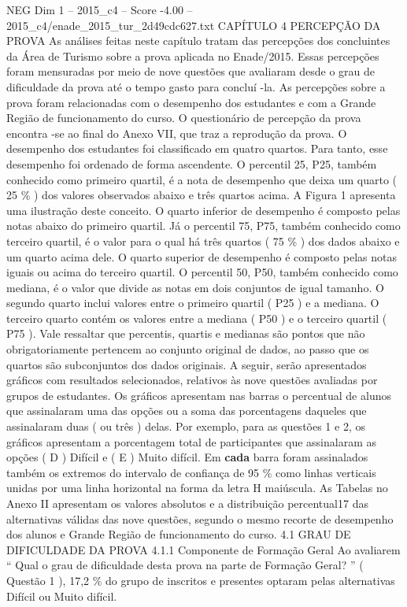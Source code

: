 \begin{textsample}{NEG Dim 1 – 2015\_c4 – Score -4.00 – 2015\_c4/enade\_2015\_tur\_2d49cdc627.txt}  \label{ex:f1_neg_102}
CAPÍTULO 4 PERCEPÇÃO DA PROVA As análises feitas neste capítulo tratam das percepções dos concluintes da Área de Turismo sobre a prova aplicada no Enade/2015.
Essas percepções foram mensuradas por meio de nove questões que avaliaram desde o grau de dificuldade da prova até o tempo gasto para concluí -la.
As percepções sobre a prova foram relacionadas com o desempenho dos estudantes e com a Grande Região de funcionamento do curso.
O questionário de percepção da prova encontra -se ao final do Anexo VII, que traz a reprodução da prova.
O desempenho dos estudantes foi classificado em quatro quartos.
Para tanto, esse desempenho foi ordenado de forma ascendente.
O percentil 25, P25, também conhecido como primeiro quartil, é a nota de desempenho que deixa um quarto ( 25 \% ) dos valores observados abaixo e três quartos acima.
A Figura 1 apresenta uma ilustração deste conceito.
O quarto inferior de desempenho é composto pelas notas abaixo do primeiro quartil.
Já o percentil 75, P75, também conhecido como terceiro quartil, é o valor para o qual há três quartos ( 75 \% ) dos dados abaixo e um quarto acima dele.
O quarto superior de desempenho é composto pelas notas iguais ou acima do terceiro quartil.
O percentil 50, P50, também conhecido como mediana, é o valor que divide as notas em dois conjuntos de igual tamanho.
O segundo quarto inclui valores entre o primeiro quartil ( P25 ) e a mediana.
O terceiro quarto contém os valores entre a mediana ( P50 ) e o terceiro quartil ( P75 ).
Vale ressaltar que percentis, quartis e medianas são pontos que não obrigatoriamente pertencem ao conjunto original de dados, ao passo que os quartos são subconjuntos dos dados originais.
A seguir, serão apresentados gráficos com resultados selecionados, relativos às nove questões avaliadas por grupos de estudantes.
Os gráficos apresentam nas barras o percentual de alunos que assinalaram uma das opções ou a soma das porcentagens daqueles que assinalaram duas ( ou três ) delas.
Por exemplo, para as questões 1 e 2, os gráficos apresentam a porcentagem total de participantes que assinalaram as opções ( D ) Difícil e ( E ) Muito difícil.
Em \textbf{cada} barra foram assinalados também os extremos do intervalo de confiança de 95 \% como linhas verticais unidas por uma linha horizontal na forma da letra H maiúscula.
As Tabelas no Anexo II apresentam os valores absolutos e a distribuição percentual17 das alternativas válidas das nove questões, segundo o mesmo recorte de desempenho dos alunos e Grande Região de funcionamento do curso. 4.1 GRAU DE DIFICULDADE DA PROVA 4.1.1 Componente de Formação Geral Ao avaliarem “ Qual o grau de dificuldade desta prova na parte de Formação Geral? ” ( Questão 1 ), 17,2 \% do grupo de inscritos e presentes optaram pelas alternativas Difícil ou Muito difícil.

\end{textsample}
